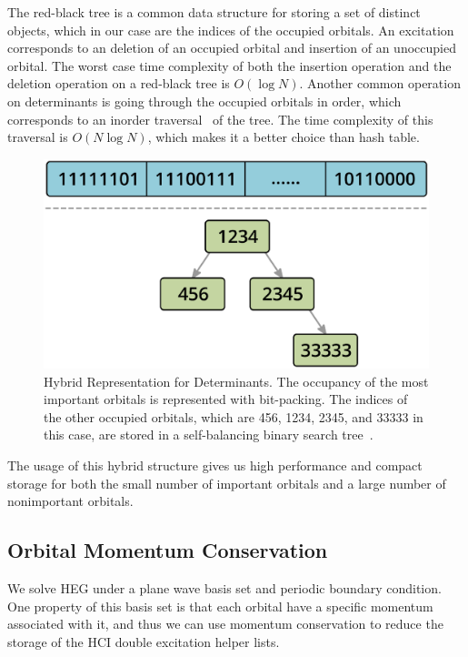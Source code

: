 The red-black tree is a common data structure for storing a set of distinct objects, which in our case are the indices of the occupied orbitals.
An excitation corresponds to an deletion of an occupied orbital and insertion of an unoccupied orbital.
The worst case time complexity of both the insertion operation and the deletion operation on a red-black tree is $O(\log N)$.
Another common operation on determinants is going through the occupied orbitals in order, which corresponds to an inorder traversal~\cite{wiki:treetraversal} of the tree.
The time complexity of this traversal is $O(N\log N)$, which makes it a better choice than hash table.
\begin{figure}
  \begin{center}
  \includegraphics[width=0.9\linewidth]{figs/HybridDet.eps}
  \end{center}
  \vspace{-0.2cm}
  \caption{Hybrid Representation for Determinants.
  The occupancy of the most important orbitals is represented with bit-packing.
  The indices of the other occupied orbitals, which are 456, 1234, 2345, and 33333 in this case, are stored in a self-balancing binary search tree~\cite{wiki:redblacktree}.
  }
  \label{fig:hybrid}
\end{figure}

The usage of this hybrid structure gives us high performance and compact storage for both the small number of important orbitals and a large number of nonimportant orbitals.

\subsection{Orbital Momentum Conservation}
We solve HEG under a plane wave basis set and periodic boundary condition.
One property of this basis set is that each orbital have a specific momentum associated with it, and thus we can use momentum conservation to reduce the storage of the HCI double excitation helper lists.


